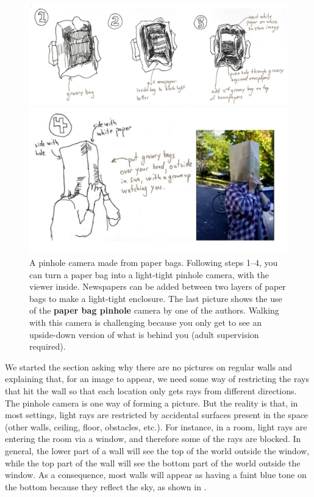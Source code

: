 \begin{figure}[t]
\centerline{
\includegraphics[width=1\linewidth]{figures/imaging/pinholeBag.pdf}
}
\centerline{
\includegraphics[width=.7\linewidth]{figures/imaging/pinholeBag2.pdf}
}
\caption{A pinhole camera made from paper bags.
Following steps 1--4, you can turn a paper bag into a light-tight pinhole camera, with the viewer inside.  Newspapers can be added between two layers of paper bags to make a light-tight enclosure. The last picture shows the use of the {\bf paper bag pinhole}
camera by one of the authors. Walking with this camera is challenging because you only get to see an upside-down version of what is behind you (adult supervision required).}
\label{fig:pinhole2}
\end{figure}


We started the section asking why there are no pictures on regular walls and explaining that, for an image to appear, we need some way of restricting the rays that hit the wall so that each location only gets rays from different directions. 
The pinhole camera is one way of forming a picture. But the reality is that, in most settings, light rays are restricted by accidental surfaces present in the space (other walls, ceiling, floor, obstacles, etc.). For instance, in a room, light rays are entering the room via a window, and therefore some of the rays are blocked. In general, the lower part of a wall will see the top of the world outside the window, while the top part of the wall will see the bottom part of the world outside the window. As a consequence, most walls will appear as having a faint blue tone on the bottom because they reflect the sky, as shown in .


